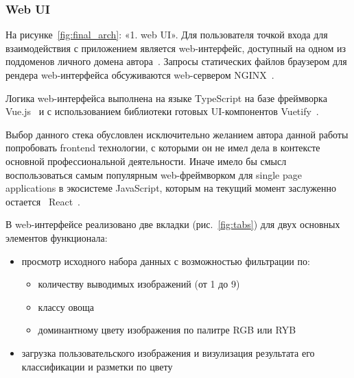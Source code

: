 \documentclass[a4paper,12pt]{extarticle}
\begin{document}
\subsubsection{Web UI}

На рисунке~\ref{fig:final_arch}: «1. web UI». Для пользователя точкой входа для взаимодействия с
приложением является web-интерфейс, доступный на одном из поддоменов личного домена
автора~\cite{hosted}. Запросы статических файлов браузером для рендера web-интерфейса обсуживаются
web-сервером NGINX~\cite{NGINX}.\par

Логика web-интерфейса выполнена на языке TypeScript на базе фреймворка Vue.js~\cite{vue} и с
использованием библиотеки готовых UI-компонентов Vuetify~\cite{vuetify}.\par

Выбор данного стека обусловлен исключительно желанием автора данной работы попробовать frontend
технологии, с которыми он не имел дела в контексте основной профессиональной деятельности. Иначе
имело бы смысл воспользоваться самым популярным web-фреймворком для single page applications в
экосистеме JavaScript, которым на текущий момент заслуженно остается~\cite{stateofjs}
React~\cite{react}.\par

В web-интерфейсе реализовано две вкладки (рис.~\ref{fig:tabs}) для двух основных элементов
функционала:

\begin{itemize}
	\item просмотр исходного набора данных с возможностью фильтрации по:
	\begin{itemize}
		\item количеству выводимых изображений (от 1 до 9)
		\item классу овоща
		\item доминантному цвету изображения по палитре RGB или RYB
	\end{itemize} 
	\item загрузка пользовательского изображения и визулизация результата его классификации и
	разметки по цвету
\end{itemize}
\end{document}
